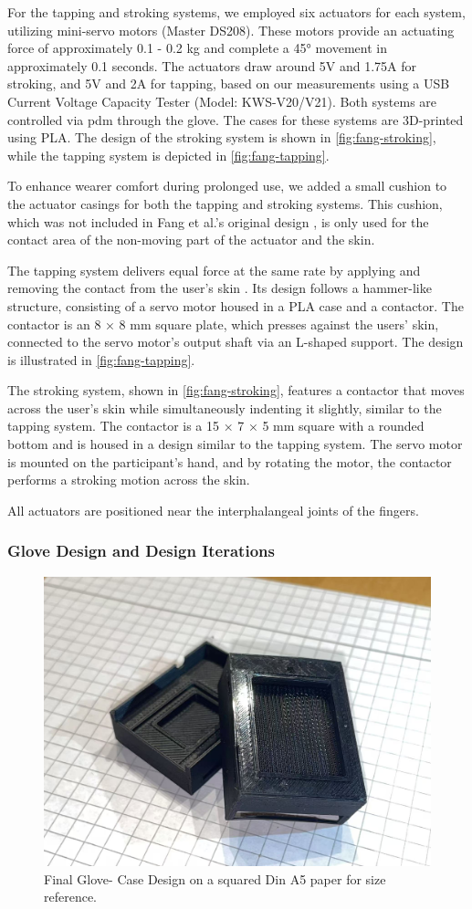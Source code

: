For the tapping and stroking systems, we employed six actuators for each system, utilizing mini-servo motors (Master DS208). These motors provide an actuating force of approximately 0.1 - 0.2 kg and complete a 45° movement in approximately 0.1 seconds. The actuators draw around 5V and 1.75A for stroking, and 5V and 2A for tapping, based on our measurements using a 
USB Current Voltage Capacity Tester (Model: KWS-V20/V21).
Both systems are controlled via \gls{pdm} through the glove. The cases for these systems are 3D-printed using PLA. The design of the stroking system is shown in \autoref{fig:fang-stroking}, while the tapping system is depicted in \autoref{fig:fang-tapping}.

To enhance wearer comfort during prolonged use, we added a small cushion to the actuator casings for both the tapping and stroking systems. This cushion, which was not included in Fang et al.’s original design \cite{Fang2023}, is only used for the contact area of the non-moving part of the actuator and the skin.

The tapping system delivers equal force at the same rate by applying and removing the contact from the user’s skin \cite{Fang2023}. Its design follows a hammer-like structure, consisting of a servo motor housed in a PLA case and a contactor. The contactor is an 8 × 8 mm square plate, which presses against the users' skin, connected to the servo motor’s output shaft via an L-shaped support. The design is illustrated in \autoref{fig:fang-tapping}.

The stroking system, shown in \autoref{fig:fang-stroking}, features a contactor that moves across the user’s skin while simultaneously indenting it slightly, similar to the tapping system. The contactor is a 15 × 7 × 5 mm square with a rounded bottom and is housed in a design similar to the tapping system. The servo motor is mounted on the participant’s hand, and by rotating the motor, the contactor performs a stroking motion across the skin.

All actuators are positioned near the interphalangeal joints of the fingers.


\subsubsection{Glove Design and Design Iterations}
\label{Glove_Design_Iteration}
\begin{figure}
    \centering
    \includegraphics[width=0.5\linewidth]{src/pictures/GloveDesigns/cases.jpg}
    \caption{Final Glove- Case Design on a squared Din A5 paper for size reference.}
    \label{fig:cases}
\end{figure}

